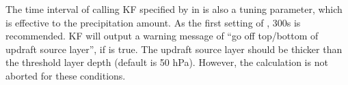 The time interval of calling KF specified by  in  is also a tuning parameter, which is effective to the precipitation amount. As the first setting of , 300s is recommended.
KF will output a warning message of ``go off top/bottom of updraft source layer'', if  is true.
The updraft source layer should be thicker than the threshold layer depth (default is 50 hPa). However, the calculation is not aborted for these conditions.

